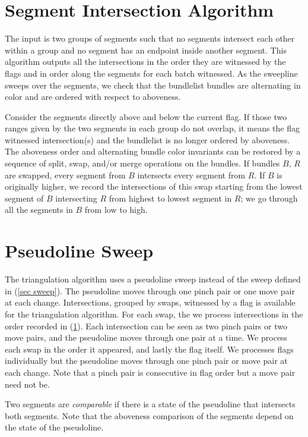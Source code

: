 \documentclass[11pt]{article}
\begin{document}
\section{Segment Intersection Algorithm} \label{sec inter}
The input is two groups of segments such that no segments intersect each other within a group and no segment has an endpoint inside another segment.
This algorithm outputs all the intersections in the order they are witnessed by the flags and in order along the segments for each batch witnessed.
As the sweepline sweeps over the segments, we check that the bundlelist bundles are alternating in color and are ordered with respect to aboveness.

Consider the segments directly above and below the current flag. 
If those two ranges given by the two segments in each group do not overlap, it means the flag witnessed intersection(s) and the bundlelist is no longer ordered by aboveness.
The aboveness order and alternating bundle color invariants can be restored by a sequence of split, swap, and/or merge operations on the bundles.
If bundles $B$, $R$ are swapped, every segment from $B$ intersects every segment from $R$.
If $B$ is originally higher, we record the intersections of this swap starting from the lowest segment of $B$ intersecting $R$ from highest to lowest segment in $R$; we go through all the segments in $B$ from low to high.

\section{Pseudoline Sweep} \label{sec pseudo}
The triangulation algorithm uses a pseudoline sweep instead of the sweep defined in (\ref{sec sweep}).
The pseudoline moves through one pinch pair or one move pair at each change.
Intersections, grouped by swaps, witnessed by a flag is available for the triangulation algorithm.
For each swap, the we process intersections in the order recorded in (\ref{sec inter}).
Each intersection can be seen as two pinch pairs or two move pairs, and the pseudoline moves through one pair at a time.
We process each swap in the order it appeared, and lastly the flag itself.
We processes flags individually but the pseudoline moves through one pinch pair or move pair at each change.
Note that a pinch pair is consecutive in flag order but a move pair need not be.

Two segments are \textit{comparable} if there is a state of the pseudoline that intersects both segments.
Note that the aboveness comparison of the segments depend on the state of the pseudoline.
\end{document}
